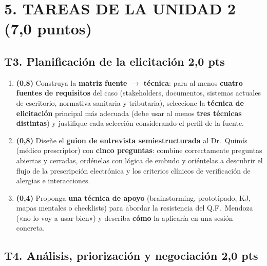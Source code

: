 \documentclass[11pt]{article}
\newcommand{\pts}[1]{\hfill{\normalsize\textbf{\textcolor{utegreendk}{#1 pts}}}}
\begin{document}
\section*{\textcolor{utegreendk}{5. TAREAS DE LA UNIDAD 2 \,(7{,}0 puntos)}}

\subsection*{T3. Planificación de la elicitación \pts{2{,}0}}

\begin{enumerate}[label=\textbf{T3.\arabic*},leftmargin=26pt,itemsep=3pt]
  \item \textbf{(0{,}8)} Construya la \textbf{matriz fuente $\rightarrow$ técnica}: para al menos \textbf{cuatro fuentes de requisitos} del caso (stakeholders, documentos, sistemas actuales de escritorio, normativa sanitaria y tributaria), seleccione la \textbf{técnica de elicitación} principal más adecuada (debe usar al menos \textbf{tres técnicas distintas}) y justifique cada selección considerando el perfil de la fuente.
  \item \textbf{(0{,}8)} Diseñe el \textbf{guion de entrevista semiestructurada} al Dr.\ Quimís (médico prescriptor) con \textbf{cinco preguntas}: combine correctamente preguntas abiertas y cerradas, ordénelas con lógica de embudo y oriéntelas a descubrir el flujo de la prescripción electrónica y los criterios clínicos de verificación de alergias e interacciones.
  \item \textbf{(0{,}4)} Proponga \textbf{una técnica de apoyo} (brainstorming, prototipado, KJ, mapas mentales o checklists) para abordar la resistencia del Q.F.\ Mendoza («no lo voy a usar bien») y describa \textbf{cómo} la aplicaría en una sesión concreta.
\end{enumerate}

\subsection*{T4. Análisis, priorización y negociación \pts{2{,}0}}
\end{document}
